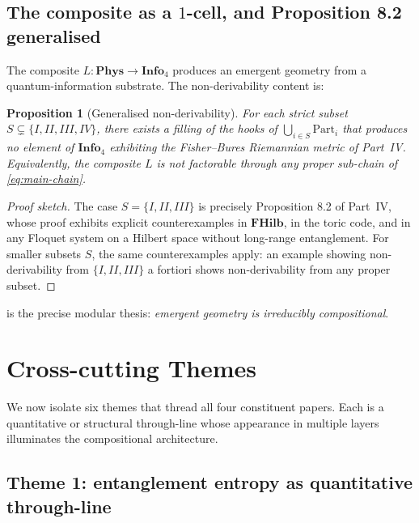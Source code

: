 \documentclass[12pt]{article}
\newtheorem{proposition}[theorem]{Proposition}
\theoremstyle{definition}
\theoremstyle{remark}
\newcommand{\Phys}{\mathbf{Phys}}
\newcommand{\Info}{\mathbf{Info}}
\newcommand{\FHilb}{\mathbf{FHilb}}
\begin{document}
\subsection{The composite as a $1$-cell, and Proposition 8.2 generalised}

The composite $L : \Phys \to \Info_4$ produces an emergent geometry from a
quantum-information substrate. The non-derivability content is:

\begin{proposition}[Generalised non-derivability]
\label{prop:gen-nonderiv}
For each strict subset $S \subsetneq \{I, II, III, IV\}$, there exists a
filling of the hooks of $\bigcup_{i \in S} \mathrm{Part}_i$ that produces
no element of $\Info_4$ exhibiting the Fisher--Bures Riemannian metric of
Part~IV. Equivalently, the composite $L$ is not factorable through any
proper sub-chain of \eqref{eq:main-chain}.
\end{proposition}

\begin{proof}[Proof sketch]
The case $S = \{I, II, III\}$ is precisely Proposition 8.2 of Part~IV, whose
proof exhibits explicit counterexamples in $\FHilb$, in the toric code, and
in any Floquet system on a Hilbert space without long-range entanglement.
For smaller subsets $S$, the same counterexamples apply: an example showing
non-derivability from $\{I, II, III\}$ a fortiori shows non-derivability
from any proper subset.
\end{proof}

 is the precise modular thesis: \emph{emergent
geometry is irreducibly compositional}.

\section{Cross-cutting Themes}
\label{sec:themes}

We now isolate six themes that thread all four constituent papers. Each is a
quantitative or structural through-line whose appearance in multiple layers
illuminates the compositional architecture.

\subsection{Theme 1: entanglement entropy as quantitative through-line}
\label{sec:theme-EE}
\end{document}
